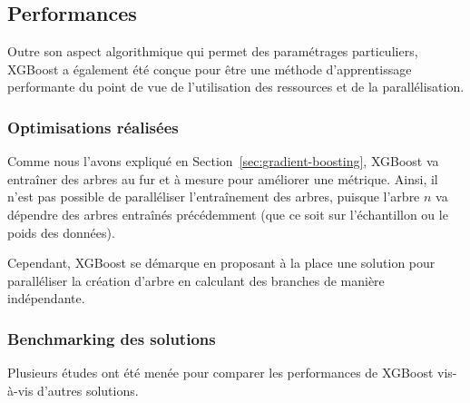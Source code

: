 \subsection{Performances}
\label{sec:perf}
Outre son aspect algorithmique qui permet des paramétrages particuliers, XGBoost a également été conçue pour être une méthode d'apprentissage performante du point de vue de l'utilisation des ressources et de la parallélisation.
\subsubsection{Optimisations réalisées}
Comme nous l'avons expliqué en Section~\ref{sec:gradient-boosting}, XGBoost va entraîner des arbres au fur et à mesure pour améliorer une métrique. Ainsi, il n'est pas possible de paralléliser l'entraînement des arbres, puisque l'arbre $n$ va dépendre des arbres entraînés précédemment (que ce soit sur l'échantillon ou le poids des données).

Cependant, XGBoost se démarque en proposant à la place une solution pour paralléliser la création d'arbre en calculant des branches de manière indépendante.
\subsubsection{Benchmarking des solutions}
Plusieurs études ont été menée pour comparer les performances de XGBoost vis-à-vis d'autres solutions.